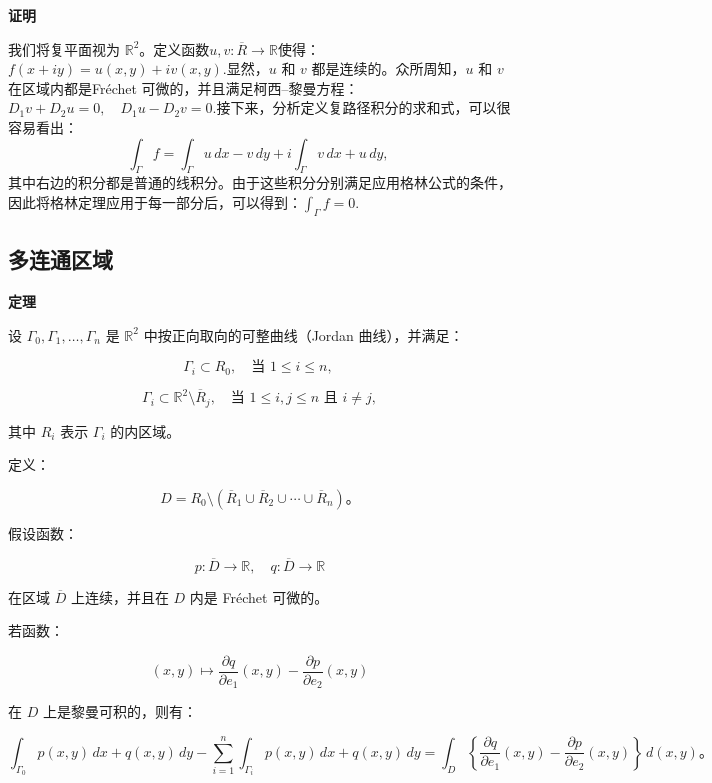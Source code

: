 \textbf{证明}

我们将复平面视为 $\mathbb{R}^2$。定义函数$u, v : \overline{R} \to \mathbb{R}$使得：$f(x + iy) = u(x, y) + i v(x, y)$.显然，$u$ 和 $v$ 都是连续的。众所周知，$u$ 和 $v$ 在区域内都是Fréchet 可微的，并且满足柯西–黎曼方程：$D_1 v + D_2 u = 0, \quad D_1 u - D_2 v = 0$.接下来，分析定义复路径积分的求和式，可以很容易看出：
$$
\int_{\Gamma} f 
= \int_{\Gamma} u \, dx - v \, dy
+ i \int_{\Gamma} v \, dx + u \, dy,~
$$
其中右边的积分都是普通的线积分。由于这些积分分别满足应用格林公式的条件，因此将格林定理应用于每一部分后，可以得到：$\int_{\Gamma} f = 0$.
\subsection{多连通区域}
\textbf{定理}

设 $\Gamma_0, \Gamma_1, \ldots, \Gamma_n$ 是 $\mathbb{R}^2$ 中按正向取向的可整曲线（Jordan 曲线），并满足：

$$
\Gamma_i \subset R_0, \quad \text{当 } 1 \leq i \leq n,~
$$

$$
\Gamma_i \subset \mathbb{R}^2 \setminus \overline{R}_j, \quad \text{当 } 1 \leq i, j \leq n \text{ 且 } i \neq j,
$$

其中 $R_i$ 表示 $\Gamma_i$ 的内区域。

定义：

$$
D = R_0 \setminus (\overline{R}_1 \cup \overline{R}_2 \cup \cdots \cup \overline{R}_n)。
$$

假设函数：

$$
p: \overline{D} \to \mathbb{R}, \quad q: \overline{D} \to \mathbb{R}
$$

在区域 $\overline{D}$ 上连续，并且在 $D$ 内是 Fréchet 可微的。

若函数：

$$
(x, y) \longmapsto 
\frac{\partial q}{\partial e_1}(x, y) - 
\frac{\partial p}{\partial e_2}(x, y)
$$

在 $D$ 上是黎曼可积的，则有：

$$
\int_{\Gamma_0} p(x, y)\,dx + q(x, y)\,dy
-
\sum_{i=1}^n 
\int_{\Gamma_i} p(x, y)\,dx + q(x, y)\,dy
=
\int_D
\left\{
\frac{\partial q}{\partial e_1}(x, y)
-
\frac{\partial p}{\partial e_2}(x, y)
\right\}
\, d(x, y)。
$$
